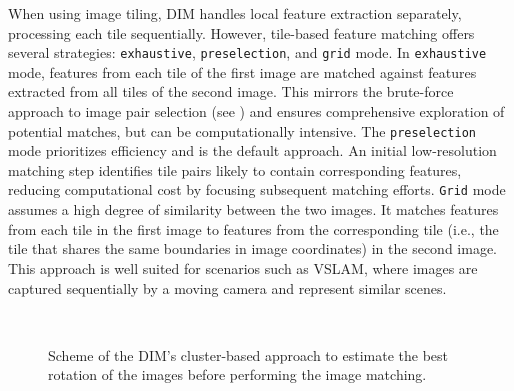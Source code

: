 When using image tiling, DIM handles local feature extraction separately, processing each tile sequentially. 
However, tile-based feature matching offers several strategies: \texttt{exhaustive}, \texttt{preselection}, and \texttt{grid} mode.
In \texttt{exhaustive} mode, features from each tile of the first image are matched against features extracted from all tiles of the second image. 
This mirrors the brute-force approach to image pair selection (see ) and ensures comprehensive exploration of potential matches, but can be computationally intensive. 
The \texttt{preselection} mode prioritizes efficiency and is the default approach. 
An initial low-resolution matching step identifies tile pairs likely to contain corresponding features, reducing computational cost by focusing subsequent matching efforts. 
\texttt{Grid} mode assumes a high degree of similarity between the two images. 
It matches features from each tile in the first image to features from the corresponding tile (i.e., the tile that shares the same boundaries in image coordinates) in the second image. 
This approach is well suited for scenarios such as VSLAM, where images are captured sequentially by a moving camera and represent similar scenes. 

\begin{figure}[hb!]
  \centering
   \\
  \caption{Scheme of the DIM's cluster-based approach to estimate the best rotation of the images before performing the image matching.}
  \label{fig:5:dim_rotations}
\end{figure}

